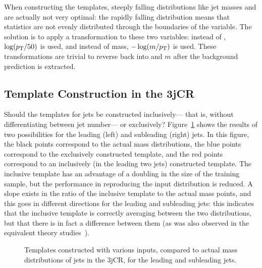 When constructing the templates, steeply falling distributions like jet masses and \pt are actually not very optimal: the rapidly falling distribution means that statistics are not evenly distributed through the boundaries of the variable. The solution is to apply a transformation to these two variables: instead of \pt, $\log(p_{\text{T}}/50)$ is used, and instead of mass, $-\log(m/p_{\text{T}})$ is used. These transformations are trivial to reverse back into \pt and $m$ after the background prediction is extracted.

\subsection{Template Construction in the 3jCR}

Should the templates for jets be constructed inclusively--- that is, without differentiating between jet number--- or exclusively? Figure~\ref{fig:search:search:background:3jCR} shows the results of two possibilities for the leading (left) and subleading (right) jets.  In this figure, the black points correspond to the actual mass distributions, the blue points correspond to the exclusively constructed template, and the red points correspond to an inclusively (in the leading two jets) constructed template. The inclusive template has an advantage of a doubling in the size of the training sample, but the performance in reproducing the input distribution is reduced. A slope exists in the ratio of the inclusive template to the actual mass points, and this goes in different directions for the leading and subleading jets: this indicates that the inclusive template is correctly averaging between the two distributions, but that there is in fact a difference between them (as was also observed in the equivalent theory studies~\cite{MassTemplates}).


\begin{figure}[!ht]
  \centering
    \caption{Templates constructed with various inputs, compared to actual mass distributions of jets in the 3jCR, for the leading and subleading jets.}
  \label{fig:search:search:background:3jCR}
\end{figure}

